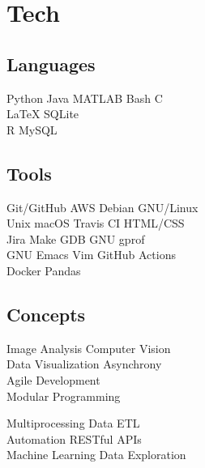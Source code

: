 \documentclass[]{jidicula-resume}
\begin{document}
\section{Tech}
\begin{minipage}[t]{.32\textwidth}
  \subsection{Languages}
  Python \textbullet{} Java \textbullet{} MATLAB \textbullet{} Bash \textbullet{} C \\
  \LaTeX{} \textbullet{} SQLite \\
  R \textbullet{} MySQL
  \sectionsep
\end{minipage}
\hfill
\begin{minipage}[t]{.32\textwidth}
  \subsection{Tools}
  Git/GitHub \textbullet{} AWS \textbullet{} {Debian GNU/Linux} \\
  Unix \textbullet{} macOS \textbullet{} Travis CI \textbullet{} HTML/CSS \\
  Jira \textbullet{} Make \textbullet{} GDB \textbullet{} GNU gprof \\
  GNU Emacs \textbullet{} Vim \textbullet{} GitHub Actions \\
  Docker \textbullet{} Pandas
  \sectionsep
\end{minipage}
\hfill
\begin{minipage}[t]{.32\textwidth}
  \subsection{Concepts}
  Image Analysis \textbullet{} Computer Vision \\
  Data Visualization \textbullet{} Asynchrony \\
  Agile Development \\
  Modular Programming
  
  Multiprocessing \textbullet{} Data ETL \\
  Automation \textbullet{}  RESTful APIs \\
  Machine Learning \textbullet{} Data Exploration
  \sectionsep
\end{minipage}
\end{document}
